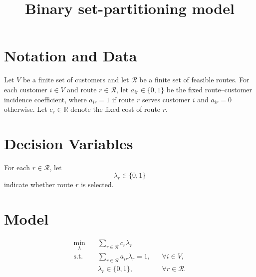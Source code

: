 \documentclass{article}
\title{Binary set-partitioning model}
\author{}
\date{}
\begin{document}
\maketitle

\section*{Notation and Data}
Let $V$ be a finite set of customers and let $\mathcal{R}$ be a finite set of feasible routes. For each customer $i\in V$ and route $r\in\mathcal{R}$, let $a_{ir}\in\{0,1\}$ be the fixed route--customer incidence coefficient, where $a_{ir}=1$ if route $r$ serves customer $i$ and $a_{ir}=0$ otherwise. Let $c_r\in\mathbb{R}$ denote the fixed cost of route $r$.

\section*{Decision Variables}
For each $r\in\mathcal{R}$, let
\[
\lambda_r\in\{0,1\}
\]
indicate whether route $r$ is selected.

\section*{Model}
\begin{align}
\min_{\lambda}\quad
&\sum_{r\in\mathcal{R}} c_r\lambda_r \\
\text{s.t.}\quad
&\sum_{r\in\mathcal{R}} a_{ir}\lambda_r=1,
&&\forall i\in V,\\
&\lambda_r\in\{0,1\},
&&\forall r\in\mathcal{R}.
\end{align}
\end{document}
